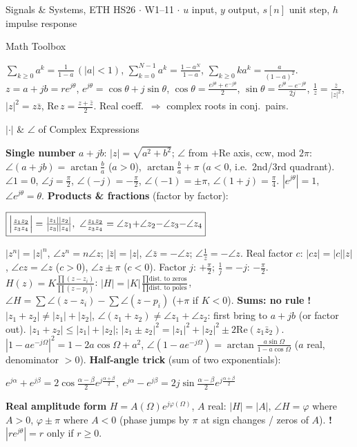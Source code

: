 \documentclass[a4paper,landscape]{article}
\newcommand{\sect}[1]{\par\vspace{1pt}\noindent\colorbox{secblue}{\parbox{\dimexpr\linewidth-2\fboxsep}{\color{white}\bfseries\fontsize{6.8}{7.6}\selectfont\strut #1}}\par\vspace{0.4pt}}
\newcommand{\sub}[1]{\par\vspace{0.6pt}\noindent\colorbox{subblue}{\parbox{\dimexpr\linewidth-2\fboxsep}{\bfseries\strut #1}}\par\vspace{0.2pt}}
\newcommand{\warn}[1]{{\color{warnred}\textbf{!}\,#1}}
\newcommand{\bx}[1]{\fbox{$\textstyle #1$}}
\newcommand{\eqc}[1]{\par\vspace{0.2pt}\centerline{$#1$}\par\vspace{0.2pt}}
\begin{document}
\fontsize{6.3}{7.05}\selectfont\raggedright\setlength{\lineskip}{0.2pt}\setlength{\lineskiplimit}{0pt}
\setlength{\abovedisplayskip}{0.6pt}\setlength{\belowdisplayskip}{0.6pt}
\setlength{\abovedisplayshortskip}{0.3pt}\setlength{\belowdisplayshortskip}{0.3pt}
\setlength{\jot}{0.2pt}
\begin{multicols*}{4}
{\fontsize{5.2}{5.8}\selectfont Signals \& Systems, ETH HS26 $\cdot$ W1--11 $\cdot$ $u$ input, $y$ output, $s[n]$ unit step, $h$ impulse response\par}

\sect{Math Toolbox}
$\sum_{k\ge0}a^k=\frac1{1-a}\,(|a|{<}1)$, $\sum_{k=0}^{N-1}a^k=\frac{1-a^N}{1-a}$, $\sum_{k\ge0}ka^k=\frac{a}{(1-a)^2}$.
$z=a{+}jb=re^{j\theta}$, $e^{j\theta}=\cos\theta+j\sin\theta$, $\cos\theta=\frac{e^{j\theta}+e^{-j\theta}}2$, $\sin\theta=\frac{e^{j\theta}-e^{-j\theta}}{2j}$, $\frac1z=\frac{\bar z}{|z|^2}$, $|z|^2=z\bar z$, $\mathrm{Re}\,z=\frac{z+\bar z}2$. Real coeff.\ $\Rightarrow$ complex roots in conj.\ pairs.
\sub{$|\cdot|$ \& $\angle$ of Complex Expressions}
\textbf{Single number} $a{+}jb$: $|z|=\sqrt{a^2{+}b^2}$; $\angle$ from $+$Re axis, ccw, mod $2\pi$: $\angle(a{+}jb)=\arctan\frac ba$ ($a{>}0$), $\arctan\frac ba{+}\pi$ ($a{<}0$, i.e.\ 2nd/3rd quadrant). $\angle1{=}0$, $\angle j{=}\frac\pi2$, $\angle({-}j){=}{-}\frac\pi2$, $\angle({-}1){=}\pm\pi$, $\angle(1{+}j){=}\frac\pi4$. $|e^{j\theta}|=1$, $\angle e^{j\theta}=\theta$.
\textbf{Products \& fractions} (factor by factor):
\eqc{\bx{\Big|\frac{z_1z_2}{z_3z_4}\Big|=\frac{|z_1||z_2|}{|z_3||z_4|},\ \angle\frac{z_1z_2}{z_3z_4}=\angle z_1{+}\angle z_2{-}\angle z_3{-}\angle z_4}}
$|z^n|=|z|^n$, $\angle z^n=n\angle z$; $|\bar z|=|z|$, $\angle\bar z=-\angle z$; $\angle\frac1z=-\angle z$. Real factor $c$: $|cz|=|c||z|$, $\angle cz=\angle z$ ($c{>}0$), $\angle z\pm\pi$ ($c{<}0$). Factor $j$: $+\frac\pi2$; $\frac1j=-j$: $-\frac\pi2$. $H(z)=K\frac{\prod(z-z_i)}{\prod(z-p_i)}$: $|H|=|K|\frac{\prod\text{dist.\ to zeros}}{\prod\text{dist.\ to poles}}$, $\angle H=\sum\angle(z{-}z_i)-\sum\angle(z{-}p_i)$ (${+}\pi$ if $K{<}0$).
\textbf{Sums: no rule} \warn{$|z_1{+}z_2|\ne|z_1|{+}|z_2|$, $\angle(z_1{+}z_2)\ne\angle z_1{+}\angle z_2$}: first bring to $a{+}jb$ (or factor out). $|z_1{+}z_2|\le|z_1|{+}|z_2|$; $|z_1{\pm}z_2|^2=|z_1|^2{+}|z_2|^2\pm2\mathrm{Re}(z_1\bar z_2)$.
$|1-ae^{-j\Omega}|^2=1-2a\cos\Omega+a^2$, $\angle(1-ae^{-j\Omega})=\arctan\frac{a\sin\Omega}{1-a\cos\Omega}$ ($a$ real, denominator $>0$).
\textbf{Half-angle trick} (sum of two exponentials):
\eqc{e^{j\alpha}{+}e^{j\beta}=2\cos\tfrac{\alpha-\beta}2e^{j\frac{\alpha+\beta}2},\ e^{j\alpha}{-}e^{j\beta}=2j\sin\tfrac{\alpha-\beta}2e^{j\frac{\alpha+\beta}2}}
\textbf{Real amplitude form} $H=A(\Omega)e^{j\varphi(\Omega)}$, $A$ real: $|H|=|A|$, $\angle H=\varphi$ where $A{>}0$, $\varphi\pm\pi$ where $A{<}0$ (phase jumps by $\pi$ at sign changes / zeros of $A$). \warn{$|re^{j\theta}|=r$ only if $r\ge0$.}


\end{multicols*}
\end{document}
